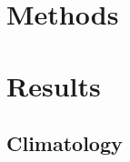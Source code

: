 \documentclass[draft]{agujournal2019}
\begin{document}
	\section{Methods}
	\label{sec:Methods}
	
	
	\section{Results}
	\label{sec:Results}
	
	\subsection{Climatology}
	\label{subsec:R_season}
	
\end{document}
